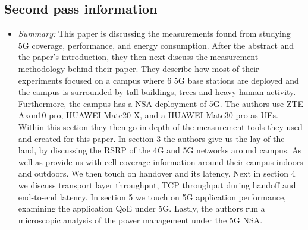 \documentclass[letterpaper,twocolumn,10pt]{article}
\begin{document}
\subsection{Second pass information}
\label{sec:second}

\begin{itemize}

\item {\it Summary:} 
This paper is discussing the measurements found from studying 5G coverage, performance, and energy consumption.
After the abstract and the paper's introduction, they then next discuss the measurement methodology behind their
paper. They describe how most of their experiments focused on a campus where 6 5G base stations are deployed
and the campus is surrounded by tall buildings, trees and heavy human activity. Furthermore, the campus has a 
NSA deployment of 5G. The authors use ZTE Axon10 pro, HUAWEI Mate20 X, and a HUAWEI Mate30 pro as UEs.
Within this section they then go in-depth of the measurement tools they used and created for this paper. In section 3 
the authors give us the lay of the land, by discussing the RSRP of the 4G and 5G networks around campus. As well 
as provide us with cell coverage information around their campus indoors and outdoors. We then touch on handover
and its latency. Next in section 4 we discuss transport layer throughput, TCP throughput during handoff and end-to-end
latency. In section 5 we touch on 5G application performance, examining the application QoE under 5G. Lastly, the 
authors run a microscopic analysis of the power management under the 5G NSA.

\end{itemize}
\end{document}
